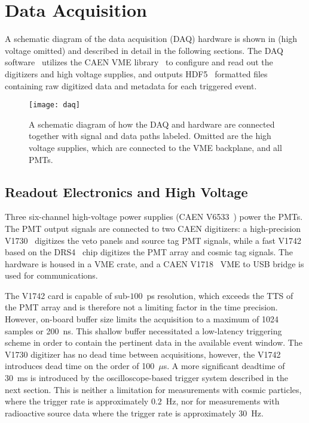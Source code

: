 \section{Data Acquisition \label{sec:daq}}

A schematic diagram of the data acquisition (DAQ) hardware is shown in   (high voltage omitted) and described in detail in the following sections. 
The DAQ software~\cite{wblsdaq} utilizes the CAEN VME library~\cite{caen-vme} to configure and read out the digitizers and high voltage supplies, and outputs HDF5~\cite{hdf5} formatted files containing raw digitized data and metadata for each triggered event.

\begin{figure}
\centering
\texttt{[image: daq]}
\caption{A schematic diagram of how the DAQ and hardware are connected together with signal and data paths labeled. Omitted are the high voltage supplies, which are connected to the VME backplane, and all PMTs.}
\label{fig:daq}
\end{figure}


\subsection{Readout Electronics and High Voltage}
Three six-channel high-voltage power supplies (CAEN V6533~\cite{v6533}) power the PMTs. 
The PMT output signals are connected to two CAEN digitizers: a high-precision V1730~\cite{v1730} digitizes the veto panels and source tag PMT signals, while a fast V1742~\cite{v1742} based on the DRS4~\cite{drs4} chip digitizes the PMT array and cosmic tag signals.  
The hardware is housed in a VME crate, and a CAEN V1718~\cite{v1718} VME to USB bridge is used for communications.  

The V1742 card is capable of sub-$100$~ps resolution, which exceeds the TTS of the PMT array and is therefore not a limiting factor in the time precision.  
However, on-board buffer size limits the acquisition to a maximum of 1024 samples or 200~ns. 
This shallow buffer necessitated a low-latency triggering scheme in order to contain the pertinent data in the available event window. 
The V1730 digitizer has no dead time between acquisitions, however, the V1742 introduces dead time on the order of 100~$\mu$s.  
A more significant deadtime of 30~ms is introduced by the oscilloscope-based trigger system described in the next section.
This is neither a limitation for measurements with cosmic particles, where the trigger rate is approximately $0.2$~Hz, nor for measurements with radioactive source data where the trigger rate is approximately $30$~Hz.  

